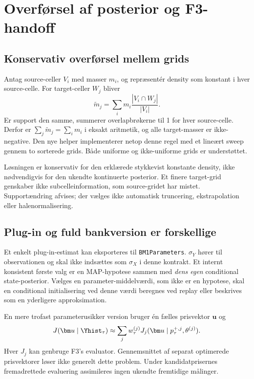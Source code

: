 \section{Overførsel af posterior og F3-handoff}
\subsection{Konservativ overførsel mellem grids}
Antag source-celler \(V_i\) med masser \(m_i\), og repræsentér density som konstant i hver source-celle. For target-celler \(W_j\) bliver
\begin{equation}
 \widetilde m_j=\sum_i m_i\frac{|V_i\cap W_j|}{|V_i|}.
 \label{eq:remap}
\end{equation}
Er support den samme, summerer overlapbrøkerne til 1 for hver source-celle. Derfor er \(\sum_j\widetilde m_j=\sum_i m_i\) i eksakt aritmetik, og alle target-masser er ikke-negative. Den nye helper implementerer netop denne regel med et lineært sweep gennem to sorterede grids. Både uniforme og ikke-uniforme grids er understøttet.

Løsningen er konservativ for den erklærede stykkevist konstante density, ikke nødvendigvis for den ukendte kontinuerte posterior. Et finere target-grid genskaber ikke subcelleinformation, som source-gridet har mistet. Supportændring afvises; der vælges ikke automatisk truncering, ekstrapolation eller halenormalisering.

\subsection{Plug-in og fuld bankversion er forskellige}
Et enkelt plug-in-estimat kan eksporteres til \texttt{BM1Parameters}. \(\sigma_Y\) hører til observationen og skal ikke indsættes som \(\sigma_X\) i denne kontrakt. Et internt konsistent første valg er en MAP-hypotese sammen med \emph{dens egen} conditional state-posterior. Vælges en parameter-middelværdi, som ikke er en hypotese, skal en conditional initialisering ved denne værdi beregnes ved replay eller beskrives som en yderligere approksimation.

En mere trofast parameterusikker version bruger én fælles prisvektor \(\bm u\) og
\begin{equation}
 J(\bm u\mid\Yhist_\tau)\approx\sum_jw_\tau^{(j)}
 J_j(\bm u\mid p_\tau^{+,j},\theta^{(j)}).
 \label{eq:handoff}
\end{equation}
Hver \(J_j\) kan genbruge F3's evaluator. Gennemsnittet af separat optimerede prisvektorer løser ikke generelt dette problem. Under kandidatprisernes fremadrettede evaluering assimileres ingen ukendte fremtidige målinger.

